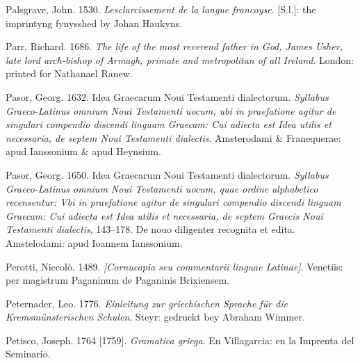 \begin{styleStandard}
Palsgrave, John. 1530. \textit{Lesclarcissement de la langue francoyse}. [S.l.]: the imprintyng fynysshed by Johan Haukyns.
\end{styleStandard}

\begin{styleStandard}
Parr, Richard. 1686. \textit{The life of the most reverend father in God, James Usher, late lord arch-bishop of Armagh, primate and metropolitan of all Ireland}. London: printed for Nathanael Ranew.
\end{styleStandard}

\begin{styleStandard}
Pasor, Georg. 1632. Idea Graecarum Noui Testamenti dialectorum. \textit{Syllabus Graeco-Latinus omnium Noui Testamenti uocum, ubi in praefatione agitur de singulari compendio discendi linguam Graecam: Cui adiecta est Idea utilis et necessaria, de septem Noui Testamenti dialectis}. Amsterodami \& Franequerae: apud Ianssonium \& apud Heynsium.
\end{styleStandard}

\begin{styleStandard}
Pasor, Georg. 1650. Idea Graecarum Noui Testamenti dialectorum. \textit{Syllabus Graeco-Latinus omnium Noui Testamenti uocum, quae ordine alphabetico recensentur: Vbi in praefatione agitur de singulari compendio discendi linguam Graecam: Cui adiecta est Idea utilis et necessaria, de septem Graecis Noui Testamenti dialectis}, 143–178. De nouo diligenter recognita et edita. Amstelodami: apud Ioannem Ianssonium.
\end{styleStandard}

\begin{styleStandard}
Perotti, Niccolò. 1489. \textit{[Cornucopia seu commentarii linguae Latinae]}. Venetiis: per magistrum Paganinum de Paganinis Brixiensem.
\end{styleStandard}

\begin{styleStandard}
Peternader, Leo. 1776. \textit{Einleitung zur griechischen Sprache für die Kremsmünsterischen Schulen}. Steyr: gedruckt bey Abraham Wimmer.
\end{styleStandard}

\begin{styleStandard}
Petisco, Joseph. 1764 [1759]. \textit{Gramatica griega}. En Villagarcia: en la Imprenta del Seminario.
\end{styleStandard}

